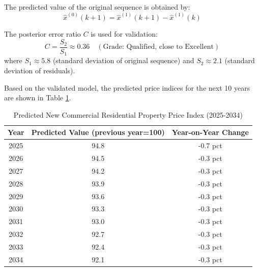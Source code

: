 \documentclass{mcmthesis}
\begin{document}
The predicted value of the original sequence is obtained by:
\begin{equation}
\hat{x}^{(0)}(k+1) = \hat{x}^{(1)}(k+1) - \hat{x}^{(1)}(k)
\label{eq:reduction}
\end{equation}

The posterior error ratio \( C \) is used for validation:
\begin{equation}
C = \frac{S_2}{S_1} \approx 0.36 \quad (\text{Grade: Qualified, close to Excellent})
\label{eq:error_test}
\end{equation}
where \( S_1 \approx 5.8 \) (standard deviation of original sequence) and \( S_2 \approx 2.1 \) (standard deviation of residuals).

Based on the validated model, the predicted price indices for the next 10 years are shown in Table \ref{tab:prediction2}.

\begin{table}[H]
    \centering
    \renewcommand{\arraystretch}{1.5}
    \begin{tabular}{c c c }
        \toprule
        Year & Predicted Value (previous year=100) & Year-on-Year Change \\
        \midrule
        2025 & 94.8 & -0.7 pct  \\
        2026 & 94.5 & -0.3 pct  \\
        2027 & 94.2 & -0.3 pct  \\
        2028 & 93.9 & -0.3 pct  \\
        2029 & 93.6 & -0.3 pct  \\
        2030 & 93.3 & -0.3 pct  \\
        2031 & 93.0 & -0.3 pct  \\
        2032 & 92.7 & -0.3 pct  \\
        2033 & 92.4 & -0.3 pct  \\
        2034 & 92.1 & -0.3 pct  \\
        \bottomrule
    \end{tabular}
    \caption{Predicted New Commercial Residential Property Price Index (2025-2034)}
    \label{tab:prediction2}
\end{table}
\end{document}
